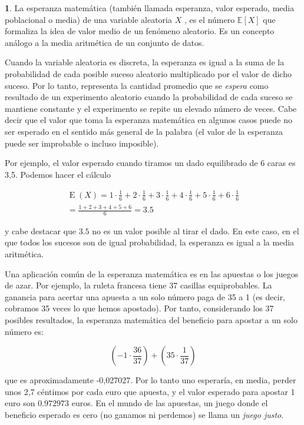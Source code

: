 \documentclass[]{book}
\theoremstyle{plain}
\theoremstyle{definition}
\theoremstyle{definition} %
\newcommand{\thistheoremname}{}
\newtheorem{genericthm}[theorem]{\thistheoremname}
\newenvironment{customdef}[1]
  {\renewcommand{\thistheoremname}{#1}%
   \begin{genericthm}}
  {\end{genericthm}}
\begin{document}
\begin{customdef}{Definición intuitiva de esperanza}
  

La esperanza matemática (también llamada esperanza, valor
esperado, media poblacional o media) de una variable aleatoria \(X\) ,
es el número \(\displaystyle \mathbb {E} [X]\) que formaliza la idea de
valor medio de un fenómeno aleatorio. Es un concepto análogo a la media
aritmética de un conjunto de datos.

Cuando la variable aleatoria es discreta, la esperanza es igual a la
suma de la probabilidad de cada posible suceso aleatorio multiplicado
por el valor de dicho suceso. Por lo tanto, representa la cantidad
promedio que se \emph{espera} como resultado de un experimento aleatorio
cuando la probabilidad de cada suceso se mantiene constante y el
experimento se repite un elevado número de veces. Cabe decir que el
valor que toma la esperanza matemática en algunos casos puede no ser
esperado en el sentido más general de la palabra (el valor de la
esperanza puede ser improbable o incluso imposible).

Por ejemplo, el valor esperado cuando tiramos un dado equilibrado de 6
caras es 3,5. Podemos hacer el cálculo

\[\displaystyle \begin{aligned}\operatorname {E} (X)=1\cdot {\frac {1}{6}}+2\cdot {\frac {1}{6}}+3\cdot {\frac {1}{6}}+4\cdot {\frac {1}{6}}+5\cdot {\frac {1}{6}}+6\cdot {\frac {1}{6}}\\[6pt]={\frac {1+2+3+4+5+6}{6}}=3.5\end{aligned}\]

y cabe destacar que \(3.5\) no es un valor posible al tirar el dado. En
este caso, en el que todos los sucesos son de igual probabilidad, la
esperanza es igual a la media aritmética.

Una aplicación común de la esperanza matemática es en las apuestas o los
juegos de azar. Por ejemplo, la ruleta francesa tiene 37 casillas
equiprobables. La ganancia para acertar una apuesta a un solo número
paga de 35 a 1 (es decir, cobramos 35 veces lo que hemos apostado). Por
tanto, considerando los 37 posibles resultados, la esperanza matemática
del beneficio para apostar a un solo número es:

\[\displaystyle \left(-1\cdot {\frac {36}{37}}\right)+\left(35\cdot {\frac {1}{37}}\right)\]

que es aproximadamente -0,027027. Por lo tanto uno esperaría, en media,
perder unos 2,7 céntimos por cada euro que apuesta, y el valor esperado
para apostar 1 euro son \(0.972973\) euros. En el mundo de las apuestas,
un juego donde el beneficio esperado es cero (no ganamos ni perdemos) se
llama un \emph{juego justo}.


\end{customdef}
\end{document}
